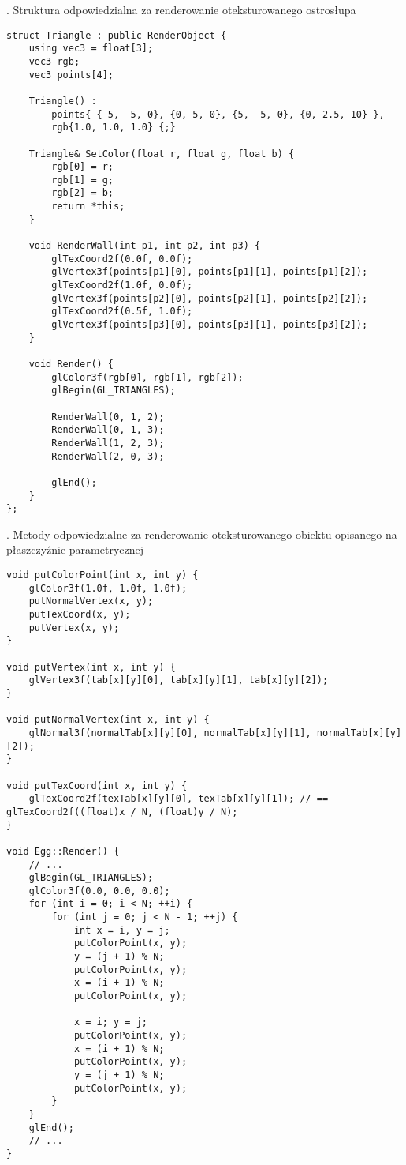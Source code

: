 \documentclass[a4paper,11pt]{article}
\begin{document}
. Struktura odpowiedzialna za renderowanie oteksturowanego ostrosłupa
\begin{verbatim}
struct Triangle : public RenderObject {
	using vec3 = float[3];
	vec3 rgb;
	vec3 points[4];

	Triangle() :
		points{ {-5, -5, 0}, {0, 5, 0}, {5, -5, 0}, {0, 2.5, 10} },
		rgb{1.0, 1.0, 1.0} {;}

	Triangle& SetColor(float r, float g, float b) {
		rgb[0] = r;
		rgb[1] = g;
		rgb[2] = b;
		return *this;
	}

	void RenderWall(int p1, int p2, int p3) {
		glTexCoord2f(0.0f, 0.0f);
		glVertex3f(points[p1][0], points[p1][1], points[p1][2]);
		glTexCoord2f(1.0f, 0.0f);
		glVertex3f(points[p2][0], points[p2][1], points[p2][2]);
		glTexCoord2f(0.5f, 1.0f);
		glVertex3f(points[p3][0], points[p3][1], points[p3][2]);
	}

	void Render() {
		glColor3f(rgb[0], rgb[1], rgb[2]);
		glBegin(GL_TRIANGLES);

		RenderWall(0, 1, 2);
		RenderWall(0, 1, 3);
		RenderWall(1, 2, 3);
		RenderWall(2, 0, 3);

		glEnd();
	}
};
\end{verbatim}
\newpage

. Metody odpowiedzialne za renderowanie oteksturowanego obiektu opisanego na płaszczyźnie parametrycznej

\begin{verbatim}
void putColorPoint(int x, int y) {
	glColor3f(1.0f, 1.0f, 1.0f);
	putNormalVertex(x, y);
	putTexCoord(x, y);
	putVertex(x, y);
}

void putVertex(int x, int y) {
	glVertex3f(tab[x][y][0], tab[x][y][1], tab[x][y][2]);
}

void putNormalVertex(int x, int y) {
	glNormal3f(normalTab[x][y][0], normalTab[x][y][1], normalTab[x][y][2]);
}

void putTexCoord(int x, int y) {
	glTexCoord2f(texTab[x][y][0], texTab[x][y][1]); // == glTexCoord2f((float)x / N, (float)y / N); 
}

void Egg::Render() {
	// ...
	glBegin(GL_TRIANGLES);
	glColor3f(0.0, 0.0, 0.0);
	for (int i = 0; i < N; ++i) {
		for (int j = 0; j < N - 1; ++j) {
			int x = i, y = j;
			putColorPoint(x, y);
			y = (j + 1) % N;
			putColorPoint(x, y);
			x = (i + 1) % N;
			putColorPoint(x, y);

			x = i; y = j;
			putColorPoint(x, y);
			x = (i + 1) % N;
			putColorPoint(x, y);
			y = (j + 1) % N;
			putColorPoint(x, y);
		}
	}
	glEnd();
	// ...
}
\end{verbatim}
\newpage
\end{document}
